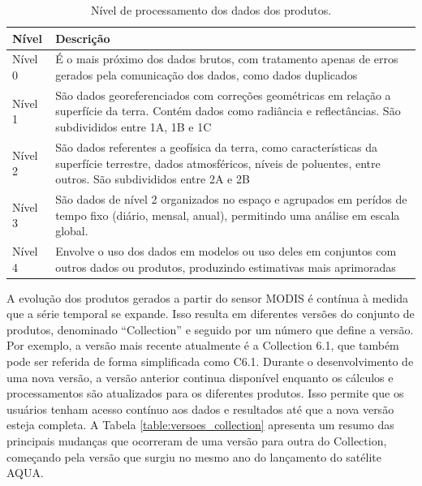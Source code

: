 \documentclass[cic,tc]{iiufrgs}
\begin{document}
\begin{table}[htbp]
\centering
\caption{Nível de processamento dos dados dos produtos.}
\begin{tabular}{ @{}lp{12cm}@{} }
  \toprule
  \textbf{Nível} & \textbf{Descrição} \\
  \midrule
  Nível 0 & É o mais próximo dos dados brutos, com tratamento apenas de erros gerados pela comunicação dos dados, como dados duplicados \\
  Nível 1 & São dados georeferenciados com correções geométricas em relação a superfície da terra. Contém dados como radiância e reflectâncias. São subdivididos entre 1A, 1B e 1C \\
  Nível 2 & São dados referentes a geofísica da terra, como características da superfície terrestre, dados atmosféricos, níveis de poluentes, entre outros. São subdivididos entre 2A e 2B \\
  Nível 3 & São dados de nível 2 organizados no espaço e agrupados em perídos de tempo fixo (diário, mensal, anual), permitindo uma análise em escala global. \\
  Nível 4 & Envolve o uso dos dados em modelos ou uso deles em conjuntos com outros dados ou produtos, produzindo estimativas mais aprimoradas \\
  \bottomrule
\end{tabular}
\label{table:nivel_processamento_produtos}
\end{table}

A evolução dos produtos gerados a partir do sensor MODIS é contínua à medida que a série temporal se expande. Isso resulta em diferentes versões do conjunto de produtos, denominado ``Collection'' e seguido por um número que define a versão. Por exemplo, a versão mais recente atualmente é a Collection 6.1, que também pode ser referida de forma simplificada como C6.1. Durante o desenvolvimento de uma nova versão, a versão anterior continua disponível enquanto os cálculos e processamentos são atualizados para os diferentes produtos. Isso permite que os usuários tenham acesso contínuo aos dados e resultados até que a nova versão esteja completa. A Tabela \ref{table:versoes_collection} apresenta um resumo das principais mudanças que ocorreram de uma versão para outra do Collection, começando pela versão que surgiu no mesmo ano do lançamento do satélite AQUA.
\end{document}
